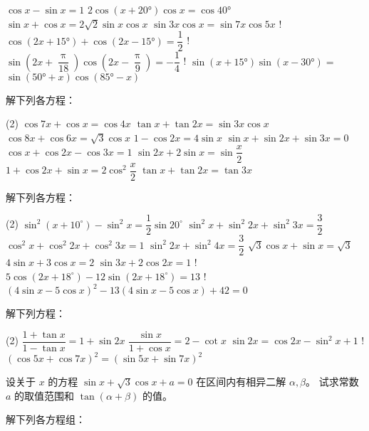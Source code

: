 \begin{Exercise}
\begin{question}
\begin{tasks}
    \task  $\cos x-\sin x=1$
    \task  $2 \cos \left(x+\ang{20}\right) \cos x=\cos \ang{40} $
    \task  $\sin x+\cos x=2 \sqrt{2} \sin x \cos x$
    \task  $\sin 3 x \cos x=\sin 7 x \cos 5 x$
    \task! $\cos \left(2 x+\ang{15}\right)+\cos \left(2 x-\ang{15}\right)=\dfrac{1}{2}$
    \task!  $\sin \left(2 x+\dfrac{\uppi}{18}\right) \cos \left(2 x-\dfrac{\uppi}{9}\right)=-\dfrac{1}{4}$
    \task! $\sin \left(x+\ang{15}\right) \sin \left(x-\ang{30}\right)=$ $\sin \left(\ang{50}+x\right) \cos \left(\ang{85}-x\right)$
  \end{tasks}
  \item 解下列各方程：
  \begin{tasks}(2)
    \task $\cos 7 x+\cos x=\cos 4 x$
    \task $\tan x+\tan 2 x=\sin 3 x \cos x$
    \task $\cos 8 x+\cos 6 x=\sqrt{3} \cos x$
    \task $1-\cos 2 x=4 \sin x$
    \task $\sin x+\sin 2x+ \sin 3x= 0$
    \task $\cos x+\cos2x-\cos3x=1$
    \task $\sin2 x+2\sin x=\sin\dfrac{x}{2}$
    \task $1+\cos2x+\sin x=2\cos^2\dfrac{x}{2}$
    \task $\tan x+\tan 2x=\tan 3x$
  \end{tasks}
  \item 解下列各方程：
  \begin{tasks}(2)
    \task $\sin ^{2}\left(x+10^{\circ}\right)-\sin ^{2} x=\dfrac{1}{2} \sin 20^{\circ}$
    \task $\sin ^{2} x+\sin ^{2} 2 x+\sin ^{2} 3 x=\dfrac{3}{2}$
    \task $\cos ^{2} x+\cos ^{2} 2 x+\cos ^{2} 3 x=1$
    \task $\sin ^{2} 2 x+\sin ^{2} 4 x=\dfrac{3}{2}$
    \task $\sqrt{3} \cos x+\sin x=\sqrt{3} $
    \task $4 \sin x+3 \cos x=2 $
    \task $\sin 3 x+2 \cos 2 x=1 $
    \task! $5 \cos \left(2 x+18^{\circ}\right)-12 \sin \left(2 x+18^{\circ}\right)=13$
    \task! $(4 \sin x-5 \cos x)^{2}-13(4 \sin x-5 \cos x)+42=0$
  \end{tasks}
  \item 解下列方程：
  \begin{tasks}(2)
    \task $\dfrac{1+\tan x}{1-\tan x}=1+\sin 2 x$
    \task $\dfrac{\sin x}{1+\cos x}=2-\cot x$
    \task $\sin 2 x=\cos 2 x-\sin ^{2} x+1$
    \task! $(\cos 5 x+\cos 7 x)^{2}=(\sin 5 x+\sin 7 x)^{2}$
  \end{tasks}
  \item 设关于 $x$ 的方程 $\sin x+\sqrt{3}\cos x+a=0$ 在区间内有相异二解 $\alpha,\beta$。 试求常数 $a$ 的取值范围和 $\tan(\alpha+\beta)$ 的值。
  \item 解下列各方程组：
\end{question}
\end{Exercise}
